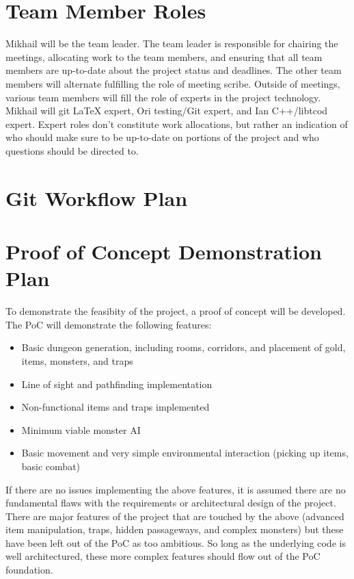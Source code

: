 \documentclass{article}
\begin{document}
\section{Team Member Roles}

Mikhail will be the team leader. The team leader is responsible for chairing the meetings, allocating work to the team members, and ensuring that all team members are up-to-date about the project status and deadlines. The other team members will alternate fulfilling the role of meeting scribe. Outside of meetings, various team members will fill the role of experts in the project technology. Mikhail will git LaTeX expert, Ori testing/Git expert, and Ian C++/libtcod expert. Expert roles don't constitute work allocations, but rather an indication of who should make sure to be up-to-date on portions of the project and who questions should be directed to.

\section{Git Workflow Plan}

\section{Proof of Concept Demonstration Plan}

To demonstrate the feasibity of the project, a proof of concept will be developed. The PoC will demonstrate the following features:

\begin{itemize}
	\item Basic dungeon generation, including rooms, corridors, and placement of gold, items, monsters, and traps
	\item Line of sight and pathfinding implementation
	\item Non-functional items and traps implemented
	\item Minimum viable monster AI
	\item Basic movement and very simple environmental interaction (picking up items, basic combat)
\end{itemize}

If there are no issues implementing the above features, it is assumed there are no fundamental flaws with the requirements or architectural design of the project. There are major features of the project that are touched by the above (advanced item manipulation, traps, hidden passageways, and complex monsters) but these have been left out of the PoC as too ambitious. So long as the underlying code is well architectured, these more complex features should flow out of the PoC foundation.\\
\end{document}
